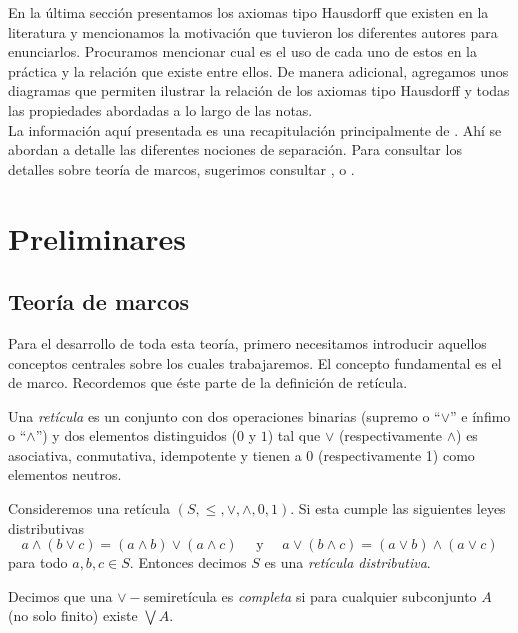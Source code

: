 \documentclass{comunicaciones}
\begin{document}
En la última sección presentamos los axiomas tipo Hausdorff que existen en la literatura y mencionamos la motivación que tuvieron los diferentes autores para enunciarlos. Procuramos mencionar cual es el uso de cada uno de estos en la práctica y la relación que existe entre ellos. De manera adicional, agregamos unos diagramas que permiten ilustrar la relación de los axiomas tipo Hausdorff y todas las propiedades abordadas a lo largo de las notas.\\  

La información aquí presentada es una recapitulación principalmente de \cite{J.P.2}. Ahí se abordan a detalle las diferentes nociones de separación. Para consultar los detalles sobre teoría de marcos, sugerimos consultar \cite{P.T.}, \cite{J.P.} o \cite{A.Z.}. 

\section{Preliminares}\label{Preliminares}

\subsection{Teoría de marcos}
Para el desarrollo de toda esta teoría, primero necesitamos introducir aquellos conceptos centrales sobre los cuales trabajaremos. El concepto fundamental es el de marco. Recordemos que éste parte de la definición de retícula.

\begin{dfn}\label{Reticula}
    Una \emph{retícula} es un conjunto con dos operaciones binarias (supremo o ``$\vee$'' e ínfimo o ``$\wedge$'') y dos elementos distinguidos ($0$ y $1$) tal que $\vee$ (respectivamente $\wedge$) es asociativa, conmutativa, idempotente y tienen a $0$ (respectivamente 1) como elementos neutros.
    \end{dfn} 
    
    \begin{dfn}\label{Reticuladistributiva}
    Consideremos una retícula $(S, \leq, \vee, \wedge, 0, 1)$. Si esta  cumple las siguientes leyes distributivas
    \[
    a\wedge (b\vee c)=(a\wedge b)\vee (a\wedge c)\quad\mbox{ y }\quad a\vee (b\wedge c)=(a\vee b)\wedge (a\vee c)
    \]
    para todo $a, b, c\in S$. Entonces decimos $S$ es una \emph{retícula distributiva}.
    \end{dfn}
    
    \begin{dfn}\label{Semiretículacompleta}
    Decimos que una $\vee-$semiretícula es \emph{completa} si para cualquier subconjunto $A$ (no solo finito) existe $\bigvee A$. 
    \end{dfn}
    
\end{document}
